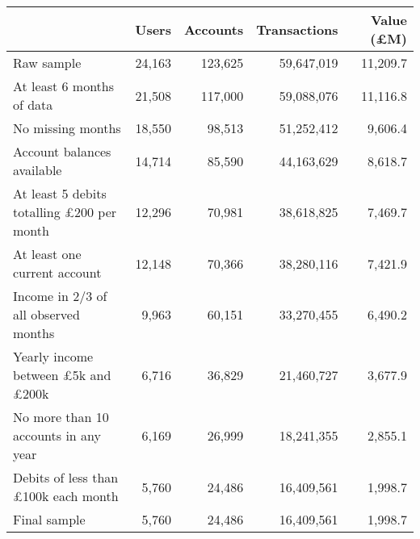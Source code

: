 \begin{tabular}{lrrrr}
\toprule
                                                 &  Users & Accounts & Transactions & Value (\pounds M) \\
\midrule
                                      Raw sample & 24,163 &  123,625 &   59,647,019 &          11,209.7 \\
                       At least 6 months of data & 21,508 &  117,000 &   59,088,076 &          11,116.8 \\
                               No missing months & 18,550 &   98,513 &   51,252,412 &           9,606.4 \\
                      Account balances available & 14,714 &   85,590 &   44,163,629 &           8,618.7 \\
At least 5 debits totalling \pounds200 per month & 12,296 &   70,981 &   38,618,825 &           7,469.7 \\
                    At least one current account & 12,148 &   70,366 &   38,280,116 &           7,421.9 \\
            Income in 2/3 of all observed months &  9,963 &   60,151 &   33,270,455 &           6,490.2 \\
 Yearly income between \pounds5k and \pounds200k &  6,716 &   36,829 &   21,460,727 &           3,677.9 \\
            No more than 10 accounts in any year &  6,169 &   26,999 &   18,241,355 &           2,855.1 \\
      Debits of less than \pounds100k each month &  5,760 &   24,486 &   16,409,561 &           1,998.7 \\
                                    Final sample &  5,760 &   24,486 &   16,409,561 &           1,998.7 \\
\bottomrule
\end{tabular}
